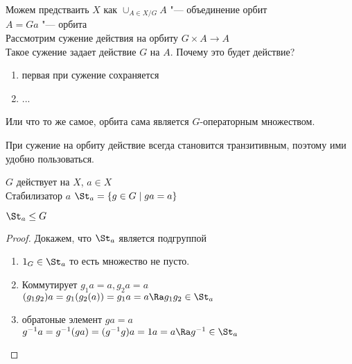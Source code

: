 Можем предстваить $X$ как
$\cup_{A \in X/G} A$ "--- объединение орбит\\
$A = Ga$ "--- орбита\\

Рассмотрим сужение действия на орбиту
$G \times A \to A$\\

Такое сужение задает действие $G$ на $A$. Почему это будет действие? 
\begin{enumerate}
\item первая при сужение сохраняется
\item ...
\end{enumerate}

Или что то же самое, орбита сама является $G$-операторным множеством.

При сужение на орбиту действие всегда становится транзитивным, поэтому ими удобно пользоваться.

\begin{Def}
$G$ действует на $X$, $a \in X$\\
Стабилизатор $a$ $\St_{a} = \{g \in G \mid ga = a\}$  \\

\end{Def}
\begin{lemma}
$\St_a \le G$
\end{lemma}
\begin{proof}
Докажем, что $\St_a$ является подгруппой 
\begin{enumerate}
\item 
$1_G \in \St_a$ то есть множество не пусто.
\item 
Коммутирует
$g_1a = a, g_2a = a$\\
$(g_1g_2)a = g_1(g_2(a)) = g_1a = a \Ra g_1g_2 \in \St_a$ \\
\item 
обратоные элемент
$ga = a$\\
$g^{-1}a = g^{-1}(ga) = (g^{-1}g)a = 1a = a \Ra g^{-1} \in \St_a$\\
\end{enumerate}
\end{proof}


